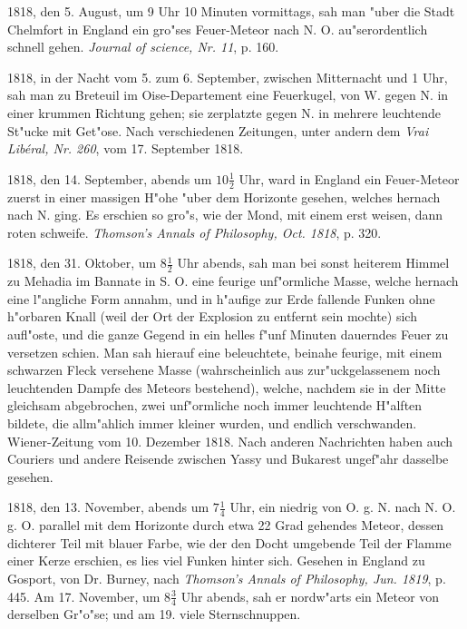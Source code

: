 \documentclass[a4paper, 11pt, oneside, polutonikogreek, german]{article}
\begin{document}
1818, den 5. August, um 9 Uhr 10 Minuten vormittags, sah man "uber die Stadt Chelmfort in England ein gro"ses Feuer-Meteor nach N. O. au"serordentlich schnell gehen. \emph{Journal of science, Nr. 11}, p. 160.

1818, in der Nacht vom 5. zum 6. September, zwischen Mitternacht und 1 Uhr, sah man zu Breteuil im Oise-Departement eine Feuerkugel, von W. gegen N. in einer krummen Richtung gehen; sie zerplatzte gegen N. in mehrere leuchtende St"ucke mit Get"ose. Nach verschiedenen Zeitungen, unter andern dem \emph{Vrai Libéral, Nr. 260}, vom 17. September 1818.

1818, den 14. September, abends um $\mathfrak{10\frac{1}{2}}$ Uhr, ward in England ein Feuer-Meteor zuerst in einer massigen H"ohe "uber dem Horizonte gesehen, welches hernach nach N. ging. Es erschien so gro"s, wie der Mond, mit einem erst weisen, dann roten schweife. \emph{Thomson's Annals of Philosophy, Oct. 1818}, p. 320.

1818, den 31. Oktober, um $\mathfrak{8\frac{1}{2}}$ Uhr abends, sah man bei sonst heiterem Himmel zu Mehadia im Bannate in S. O. eine feurige unf"ormliche Masse, welche hernach eine l"angliche Form annahm, und in h"aufige zur Erde fallende Funken ohne h"orbaren Knall (weil der Ort der Explosion zu entfernt sein mochte) sich aufl"oste, und die ganze Gegend in ein helles f"unf Minuten dauerndes Feuer zu versetzen schien. Man sah hierauf eine beleuchtete, beinahe feurige, mit einem schwarzen Fleck versehene Masse (wahrscheinlich aus zur"uckgelassenem noch leuchtenden Dampfe des Meteors bestehend), welche, nachdem sie in der Mitte gleichsam abgebrochen, zwei unf"ormliche noch immer leuchtende H"alften bildete, die allm"ahlich immer kleiner wurden, und endlich verschwanden. Wiener-Zeitung vom 10. Dezember 1818. Nach anderen Nachrichten haben auch Couriers und andere Reisende zwischen Yassy und Bukarest ungef"ahr dasselbe gesehen.

1818, den 13. November, abends um $\mathfrak{7\frac{1}{4}}$ Uhr, ein niedrig von O. g. N. nach N. O. g. O. parallel mit dem Horizonte durch etwa 22 Grad gehendes Meteor, dessen dichterer Teil mit blauer Farbe, wie der den Docht umgebende Teil der Flamme einer Kerze erschien, es lies viel Funken hinter sich. Gesehen in England zu Gosport, von Dr. Burney, nach \emph{Thomson's Annals of Philosophy, Jun. 1819}, p. 445. Am 17. November, um $\mathfrak{8\frac{3}{4}}$ Uhr abends, sah er nordw"arts ein Meteor von derselben Gr"o"se; und am 19. viele Sternschnuppen.
\end{document}
